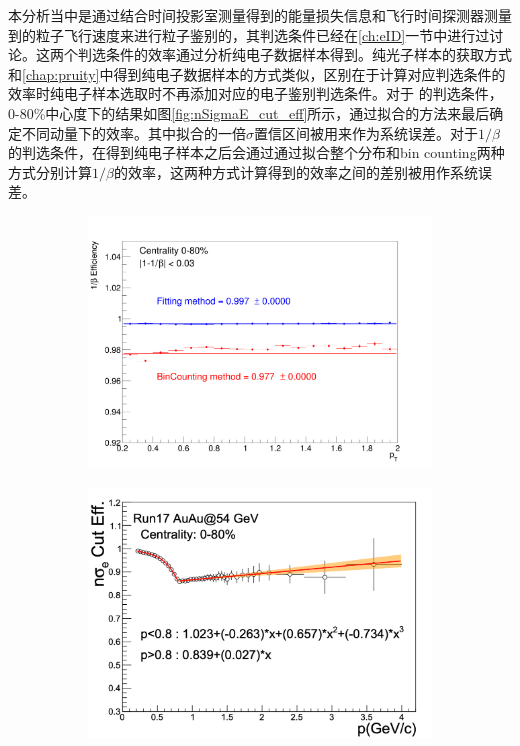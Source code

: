 本分析当中是通过结合时间投影室测量得到的能量损失信息和飞行时间探测器测量到的粒子飞行速度来进行粒子鉴别的，其判选条件已经在\ref{ch:eID}一节中进行过讨论。这两个判选条件的效率通过分析纯电子数据样本得到。纯光子样本的获取方式和\ref{chap:pruity}中得到纯电子数据样本的方式类似，区别在于计算对应判选条件的效率时纯电子样本选取时不再添加对应的电子鉴别判选条件。对于 \nSigmaE 的判选条件，0-80\%中心度下的结果如图\ref{fig:nSigmaE_cut_eff}所示，通过拟合的方法来最后确定不同动量下的效率。其中拟合的一倍$\sigma$置信区间被用来作为系统误差。对于$1/\beta$的判选条件，在得到纯电子样本之后会通过通过拟合整个分布和bin counting两种方式分别计算$1/\beta$的效率，这两种方式计算得到的效率之间的差别被用作系统误差。

\begin{figure}[htb]
    \centering
    \begin{subfigure}[b]{0.47\textwidth}
        \centering
        \includegraphics[width=\textwidth,clip]{figures/Chapter4/beta_cut_eff_080.png}
        \caption{}
        \label{fig:beta_cut_eff_080}
    \end{subfigure}
    \hfill
    \begin{subfigure}[b]{0.47\textwidth}
        \centering
        \includegraphics[width=\textwidth,clip]{figures/Chapter4/nSigmaE_cut_eff.png}

\end{subfigure}
\end{figure}
